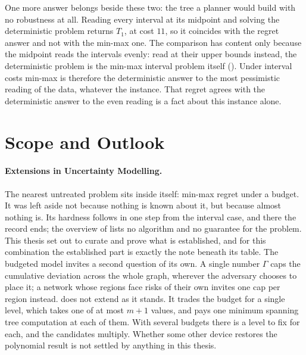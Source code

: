 One more answer belongs beside these two: the tree a planner would build with no robustness at all.
Reading every interval at its midpoint and solving the deterministic problem returns $T_1$, at cost $11$, so it coincides with the regret answer and not with the min-max one.
The comparison has content only because the midpoint reads the intervals evenly: read at their upper bounds instead, the deterministic problem is the min-max interval problem itself ().
Under interval costs min-max is therefore the deterministic answer to the most pessimistic reading of the data, whatever the instance.
That regret agrees with the deterministic answer to the even reading is a fact about this instance alone.

\section{Scope and Outlook}\label{sec:outlook}

\paragraph{Extensions in Uncertainty Modelling.}

The nearest untreated problem sits inside  itself: min-max regret under a budget.
It was left aside not because nothing is known about it, but because almost nothing is.
Its hardness follows in one step from the interval case, and there the record ends; the overview of \textcite[Table~8.1]{Goerigk2021RCO} lists no algorithm and no guarantee for the problem.
This thesis set out to curate and prove what is established, and for this combination the established part is exactly the note beneath its table.
The budgeted model invites a second question of its own.
A single number $\Gamma$ caps the cumulative deviation across the whole graph, wherever the adversary chooses to place it; a network whose regions face risks of their own invites one cap per region instead.
 does not extend as it stands.
It trades the budget for a single level, which takes one of at most $m + 1$ values, and pays one minimum spanning tree computation at each of them.
With several budgets there is a level to fix for each, and the candidates multiply.
Whether some other device restores the polynomial result is not settled by anything in this thesis.

